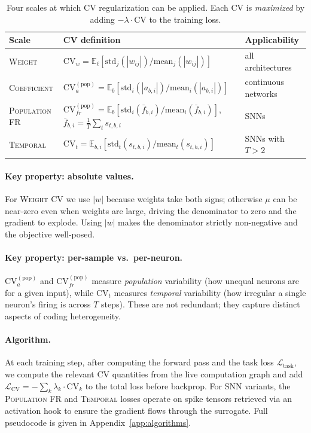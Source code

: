 \documentclass{article}
\begin{document}
\begin{table}[h]
\centering
\small
\begin{tabular}{lll}
\toprule
\textbf{Scale} & \textbf{CV definition} & \textbf{Applicability} \\ \midrule
\textsc{Weight}         & $\mathrm{CV}_w = \mathbb{E}_\ell\!\left[\mathrm{std}_j(|w_{ij}|)/\mathrm{mean}_j(|w_{ij}|)\right]$                              & all architectures \\
\textsc{Coefficient}    & $\mathrm{CV}_a^{(\text{pop})} = \mathbb{E}_b\!\left[\mathrm{std}_i(|a_{b,i}|)/\mathrm{mean}_i(|a_{b,i}|)\right]$ & continuous networks \\
\textsc{Population FR}  & $\mathrm{CV}_{fr}^{(\text{pop})} = \mathbb{E}_b\!\left[\mathrm{std}_i(\bar{f}_{b,i})/\mathrm{mean}_i(\bar{f}_{b,i})\right]$, \;$\bar{f}_{b,i} = \tfrac{1}{T}\sum_t s_{t,b,i}$ & SNNs \\
\textsc{Temporal}       & $\mathrm{CV}_t = \mathbb{E}_{b,i}\!\left[\mathrm{std}_t(s_{t,b,i})/\mathrm{mean}_t(s_{t,b,i})\right]$ & SNNs with $T > 2$ \\
\bottomrule
\end{tabular}
\caption{Four scales at which CV regularization can be applied. Each CV is \emph{maximized} by adding $-\lambda \cdot \mathrm{CV}$ to the training loss.}
\label{tab:cv-scales}
\end{table}

\paragraph{Key property: absolute values.}
For \textsc{Weight} CV we use $|w|$ because weights take both signs; otherwise $\mu$ can be near-zero even when weights are large, driving the denominator to zero and the gradient to explode. Using $|w|$ makes the denominator strictly non-negative and the objective well-posed.

\paragraph{Key property: per-sample vs.\ per-neuron.}
$\mathrm{CV}_a^{(\text{pop})}$ and $\mathrm{CV}_{fr}^{(\text{pop})}$ measure \emph{population} variability (how unequal neurons are for a given input), while $\mathrm{CV}_t$ measures \emph{temporal} variability (how irregular a single neuron's firing is across $T$ steps). These are not redundant; they capture distinct aspects of coding heterogeneity.

\paragraph{Algorithm.} At each training step, after computing the forward pass and the task loss $\mathcal{L}_{\text{task}}$, we compute the relevant CV quantities from the live computation graph and add $\mathcal{L}_{\text{CV}} = -\sum_{k} \lambda_k \cdot \mathrm{CV}_k$ to the total loss before backprop. For SNN variants, the \textsc{Population FR} and \textsc{Temporal} losses operate on spike tensors retrieved via an activation hook to ensure the gradient flows through the surrogate. Full pseudocode is given in Appendix~\ref{app:algorithms}.
\end{document}
